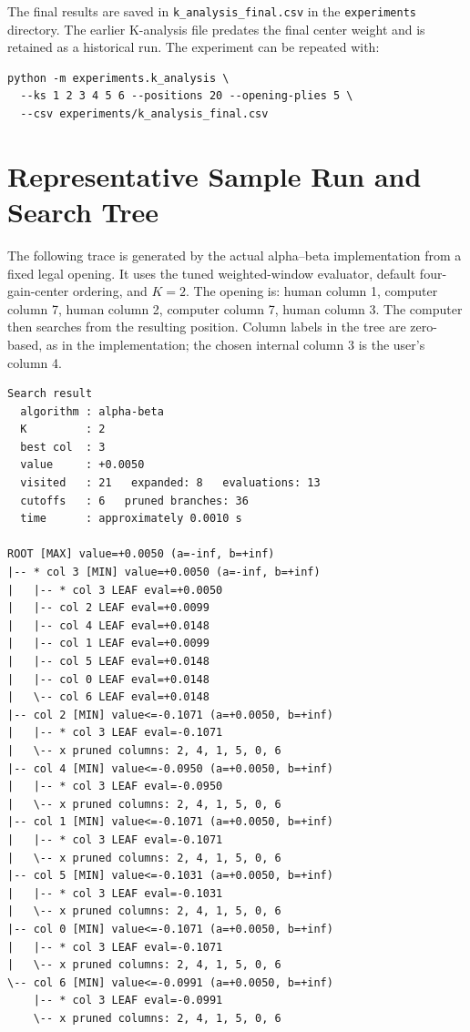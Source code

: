 \documentclass[11pt,a4paper]{article}
\begin{document}
The final results are saved in \texttt{k\_analysis\_final.csv} in the
\texttt{experiments} directory. The earlier K-analysis file predates the
final center weight and is retained as a historical run. The experiment can
be repeated with:
\begin{lstlisting}
python -m experiments.k_analysis \
  --ks 1 2 3 4 5 6 --positions 20 --opening-plies 5 \
  --csv experiments/k_analysis_final.csv
\end{lstlisting}

\section{Representative Sample Run and Search Tree}

The following trace is generated by the actual alpha--beta implementation from
a fixed legal opening. It uses the tuned weighted-window evaluator, default
four-gain-center ordering, and $K=2$. The opening is: human column 1, computer
column 7, human column 2, computer column 7, human column 3. The computer then
searches from the resulting position. Column labels in the tree are zero-based,
as in the implementation; the chosen internal column 3 is the user's column 4.

\begin{lstlisting}
Search result
  algorithm : alpha-beta
  K         : 2
  best col  : 3
  value     : +0.0050
  visited   : 21   expanded: 8   evaluations: 13
  cutoffs   : 6   pruned branches: 36
  time      : approximately 0.0010 s

ROOT [MAX] value=+0.0050 (a=-inf, b=+inf)
|-- * col 3 [MIN] value=+0.0050 (a=-inf, b=+inf)
|   |-- * col 3 LEAF eval=+0.0050
|   |-- col 2 LEAF eval=+0.0099
|   |-- col 4 LEAF eval=+0.0148
|   |-- col 1 LEAF eval=+0.0099
|   |-- col 5 LEAF eval=+0.0148
|   |-- col 0 LEAF eval=+0.0148
|   \-- col 6 LEAF eval=+0.0148
|-- col 2 [MIN] value<=-0.1071 (a=+0.0050, b=+inf)
|   |-- * col 3 LEAF eval=-0.1071
|   \-- x pruned columns: 2, 4, 1, 5, 0, 6
|-- col 4 [MIN] value<=-0.0950 (a=+0.0050, b=+inf)
|   |-- * col 3 LEAF eval=-0.0950
|   \-- x pruned columns: 2, 4, 1, 5, 0, 6
|-- col 1 [MIN] value<=-0.1071 (a=+0.0050, b=+inf)
|   |-- * col 3 LEAF eval=-0.1071
|   \-- x pruned columns: 2, 4, 1, 5, 0, 6
|-- col 5 [MIN] value<=-0.1031 (a=+0.0050, b=+inf)
|   |-- * col 3 LEAF eval=-0.1031
|   \-- x pruned columns: 2, 4, 1, 5, 0, 6
|-- col 0 [MIN] value<=-0.1071 (a=+0.0050, b=+inf)
|   |-- * col 3 LEAF eval=-0.1071
|   \-- x pruned columns: 2, 4, 1, 5, 0, 6
\-- col 6 [MIN] value<=-0.0991 (a=+0.0050, b=+inf)
    |-- * col 3 LEAF eval=-0.0991
    \-- x pruned columns: 2, 4, 1, 5, 0, 6
\end{lstlisting}
\end{document}

